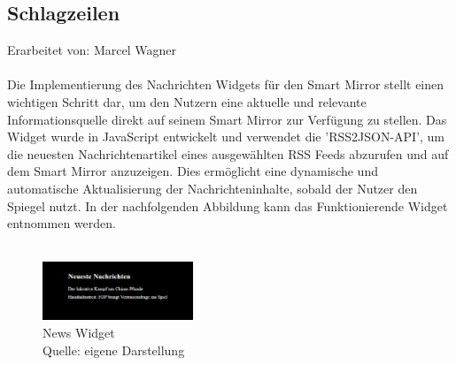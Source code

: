 \subsection{Schlagzeilen}
Erarbeitet von: Marcel Wagner \\ \\
\noindent
Die Implementierung des Nachrichten Widgets für den Smart Mirror stellt einen wichtigen Schritt dar, um den Nutzern eine aktuelle und relevante Informationsquelle direkt auf seinem Smart Mirror zur Verfügung zu stellen. Das Widget wurde in JavaScript entwickelt und verwendet die 'RSS2JSON-API', um die neuesten Nachrichtenartikel eines ausgewählten RSS Feeds abzurufen und auf dem Smart Mirror anzuzeigen. Dies ermöglicht eine dynamische und automatische Aktualisierung der Nachrichteninhalte, sobald der Nutzer den Spiegel nutzt. In der nachfolgenden Abbildung kann das Funktionierende Widget entnommen werden.\\ \\

\noindent
\begin{figure}[h]
    \centering
    \includegraphics[width=0.4\textwidth]{pictures/news_widget.png}
  \captionsetup{justification=centering, labelformat=simple, singlelinecheck=false}
    \caption[News Widget]{News Widget\\ Quelle: eigene Darstellung}
\end{figure}

